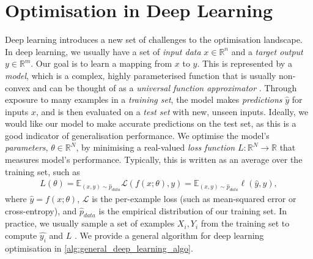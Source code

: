 
\section{Optimisation in Deep Learning}
\label{sec:optimisation_in_deep_learning}

Deep learning introduces a new set of challenges to the optimisation landscape. In deep learning, we usually have a set of \textit{input data} $x \in \mathbb{R}^n$ and a \textit{target output} $y \in \mathbb{R}^m$. Our goal is to learn a mapping from $x$ to $y$. This is represented by a \textit{model}, which is a complex, highly parameterised function that is usually non-convex and can be thought of as a \textit{universal function approximator} \citep{universal_func_approx}. Through exposure to many examples in a \textit{training set}, the model makes \textit{predictions} $\hat{y}$ for inputs $x$, and is then evaluated on a \textit{test set} with new, unseen inputs. Ideally, we would like our model to make accurate predictions on the test set, as this is a good indicator of generalisation performance. We optimise the model's \textit{parameters}, $\theta \in \mathbb{R}^N$, by minimising a real-valued \textit{loss function} $L: \mathbb{R}^N \to \mathbb{R}$ that measures model's performance. Typically, this is written as an average over the training set, such as
\begin{align}
    L(\theta) = \mathbb{E}_{(x, y) \sim \hat{p}_{data}} \mathcal{L}(f(x; \theta), y) = \mathbb{E}_{(x, y) \sim \hat{p}_{data}} \ell(\hat{y}, y),
    \label{eq:loss_function}
\end{align}
where $\hat{y} = f(x; \theta)$, $\mathcal{L}$ is the per-example loss (such as mean-squared error or cross-entropy), and $\hat{p}_{data}$ is the empirical distribution of our training set. In practice, we usually sample a set of examples $X_i, Y_i$ from the training set to compute $\hat{y_i}$ and $L$ \citep{deep_learning_book, pytorch}. We provide a general algorithm for deep learning optimisation in \cref{alg:general_deep_learning_algo}.

